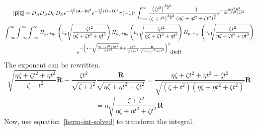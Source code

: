 \begin{multline}
  \left[\overline{\mathbf{p}}\middle|\overline{\mathbf{q}}\right] = D_A D_B D_C D_D e^{-\frac{\alpha\beta}{\zeta}\left(\mathbf{A} - \mathbf{B}\right)^2}e^{-\frac{\gamma\delta}{\eta}\left(\mathbf{C} - \mathbf{D}\right)^2}\pi (-1)^{q} \int_{-\infty}^\infty \frac{\left(\zeta t^2\right)^{\frac{p + q}{2}}}{\left(\zeta + t^2\right)^{\frac{p + q}{2}}}\frac{1}{\left(\eta \zeta + \eta t^2 + \zeta t^2\right)^{\frac{3}{2}}} e^{-\frac{\eta\zeta t^2 R^2}{\eta\zeta + \eta t^2 + \zeta t^2}}\\
  \int_{-\infty}^\infty\int_{-\infty}^\infty\int_{-\infty}^\infty H_{p_x + q_x}\left(v_x\sqrt{\frac{\zeta t^2}{\eta\zeta + \zeta t^2 + \eta t^2}}\right)H_{p_y + q_y}\left(v_y\sqrt{\frac{\zeta t^2}{\eta\zeta + \zeta t^2 + \eta t^2}}\right)H_{p_z + q_z}\left(v_z\sqrt{\frac{\zeta t^2}{\eta\zeta + \zeta t^2 + \eta t^2}}\right) \\
  e^{-\left(\mathbf{v} - \sqrt{\frac{\eta\zeta + \zeta t^2 + \eta t^2}{\zeta + t^2}} \mathbf{R} + \frac{\zeta t^2}{\sqrt{\zeta + t^2}}\frac{\mathbf{R}}{\sqrt{\eta\zeta + \eta t^2 + \zeta t^2}}\right)^2} \mathrm{d}\mathbf{v} \mathrm{d} t
\end{multline}
The exponent can be rewritten.
\begin{equation}
  \sqrt{\frac{\eta\zeta + \zeta t^2 + \eta t^2}{\zeta + t^2}} \mathbf{R} - \frac{\zeta t^2}{\sqrt{\zeta + t^2}}\frac{\mathbf{R}}{\sqrt{\eta\zeta + \eta t^2 + \zeta t^2}} = \frac{\eta\zeta + \zeta t^2 + \eta t^2 - \zeta t^2}{\sqrt{\left(\zeta + t^2\right)\left(\eta\zeta + \eta t^2 + \zeta t^2\right)}}\mathbf{R}
\end{equation}
\begin{equation}
  = \eta \sqrt{\frac{\zeta + t^2}{\eta\zeta + \eta t^2 + \zeta t^2}}\mathbf{R}
\end{equation}
Now, use equation~\ref{herm-int-solved} to transform the integral.
